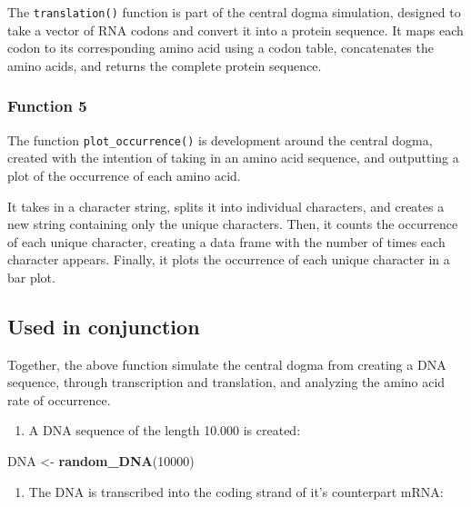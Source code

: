 \documentclass[
]{article}
\newenvironment{Shaded}{\begin{snugshade}}{\end{snugshade}}
\newcommand{\DecValTok}[1]{\textcolor[rgb]{0.00,0.00,0.81}{#1}}
\newcommand{\FunctionTok}[1]{\textcolor[rgb]{0.13,0.29,0.53}{\textbf{#1}}}
\newcommand{\NormalTok}[1]{#1}
\newcommand{\OtherTok}[1]{\textcolor[rgb]{0.56,0.35,0.01}{#1}}
\providecommand{\tightlist}{%
  \setlength{\itemsep}{0pt}\setlength{\parskip}{0pt}}
\begin{document}
The \texttt{translation()} function is part of the central dogma
simulation, designed to take a vector of RNA codons and convert it into
a protein sequence. It maps each codon to its corresponding amino acid
using a codon table, concatenates the amino acids, and returns the
complete protein sequence.

\subsubsection{Function 5}\label{function-5}

The function \texttt{plot\_occurrence()} is development around the
central dogma, created with the intention of taking in an amino acid
sequence, and outputting a plot of the occurrence of each amino acid.

It takes in a character string, splits it into individual characters,
and creates a new string containing only the unique characters. Then, it
counts the occurrence of each unique character, creating a data frame
with the number of times each character appears. Finally, it plots the
occurrence of each unique character in a bar plot.

\subsection{Used in conjunction}\label{used-in-conjunction}

Together, the above function simulate the central dogma from creating a
DNA sequence, through transcription and translation, and analyzing the
amino acid rate of occurrence.

\begin{enumerate}
\def\labelenumi{\arabic{enumi}.}
\tightlist
\item
  A DNA sequence of the length 10.000 is created:
\end{enumerate}

\begin{Shaded}
\begin{Highlighting}[]
\NormalTok{DNA }\OtherTok{\textless{}{-}} \FunctionTok{random\_DNA}\NormalTok{(}\DecValTok{10000}\NormalTok{)}
\end{Highlighting}
\end{Shaded}

\begin{enumerate}
\def\labelenumi{\arabic{enumi}.}
\setcounter{enumi}{1}
\tightlist
\item
  The DNA is transcribed into the coding strand of it's counterpart
  mRNA:
\end{enumerate}
\end{document}
